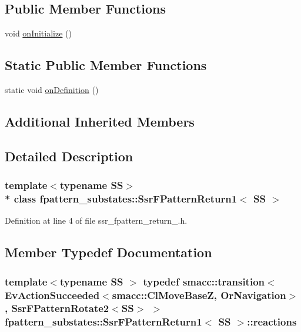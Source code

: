 \subsection*{Public Member Functions}
\begin{DoxyCompactItemize}
\item 
void \hyperlink{structfpattern__substates_1_1SsrFPatternReturn1_a717823642390dd20e05b970aba26926d}{on\+Initialize} ()
\end{DoxyCompactItemize}
\subsection*{Static Public Member Functions}
\begin{DoxyCompactItemize}
\item 
static void \hyperlink{structfpattern__substates_1_1SsrFPatternReturn1_a8a90d897c99b557f678b25bcf59d757d}{on\+Definition} ()
\end{DoxyCompactItemize}
\subsection*{Additional Inherited Members}


\subsection{Detailed Description}
\subsubsection*{template$<$typename SS$>$\\*
class fpattern\+\_\+substates\+::\+Ssr\+F\+Pattern\+Return1$<$ S\+S $>$}



Definition at line 4 of file ssr\+\_\+fpattern\+\_\+return\+\_.\+h.



\subsection{Member Typedef Documentation}
\subsubsection[{\texorpdfstring{reactions}{reactions}}]{\setlength{\rightskip}{0pt plus 5cm}template$<$typename SS $>$ typedef {\bf smacc\+::transition}$<$Ev\+Action\+Succeeded$<${\bf smacc\+::\+Cl\+Move\+BaseZ}, Or\+Navigation$>$, {\bf Ssr\+F\+Pattern\+Rotate2}$<$SS$>$ $>$ {\bf fpattern\+\_\+substates\+::\+Ssr\+F\+Pattern\+Return1}$<$ SS $>$\+::{\bf reactions}}\hypertarget{structfpattern__substates_1_1SsrFPatternReturn1_a93bd6922760543898863d82124bd1932}{}\label{structfpattern__substates_1_1SsrFPatternReturn1_a93bd6922760543898863d82124bd1932}


